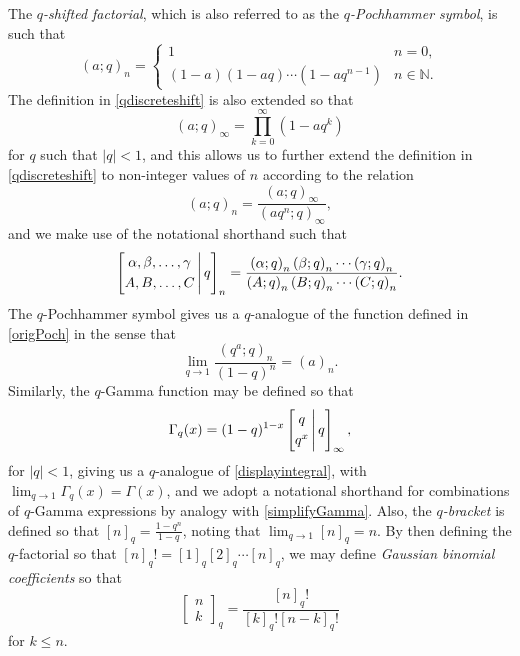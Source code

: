 \documentclass[12pt]{article}
\begin{document}
 The \emph{$q$-shifted factorial}, which is also referred to as the \emph{$q$-Pochhammer 
 symbol}, is such that 
\begin{equation}\label{qdiscreteshift}
 (a;q)_{n} = \begin{cases} 
 1 & n = 0, \\
 (1-a)(1-aq) \cdots (1-aq^{n-1}) & n \in \mathbb{N}. 
 \end{cases}
\end{equation}
 The definition in \eqref{qdiscreteshift} is also extended so that $$ (a;q)_{\infty} = \prod_{k=0}^{\infty} (1-aq^k) $$ for $q$ such that $|q| < 
 1$, and this allows us to further extend the definition in \eqref{qdiscreteshift} to 
 non-integer values of $n$ according to the relation 
 $$ (a;q)_{n} = \frac{(a;q)_{\infty}}{(aq^n;q)_{\infty}}, $$
 and we make use of the notational shorthand such that 
\begin{equation*}
 \left[ \begin{matrix} \alpha, \beta, \ldots, \gamma \vspace{1mm} \\ 
 A, B, \ldots, C \end{matrix} \, \Bigg| \, q \right]_{n} 
 = \frac{ \left( \alpha; q \right)_{n} 
 \left( \beta; q \right)_{n} \cdots \left( \gamma; q \right)_{n} }{ 
 \left( A; q \right)_{n} 
 \left( B; q \right)_{n} \cdots \left( C; q \right)_{n}}. 
\end{equation*}
 The $q$-Pochhammer symbol gives us a $q$-analogue of the function defined in \eqref{origPoch}
 in the sense that 
 $$ \lim_{q \to 1} \frac{ \left( q^{a};q \right)_{n} }{(1-q)^{n}} = (a)_{n}. $$
 Similarly, the $q$-Gamma function may be defined so that
 $$ \Gamma_{q}(x) = (1-q)^{1-x} \left[ \begin{matrix} q \vspace{1mm} \\ 
 q^{x} \end{matrix} \, \Bigg| \, q \right]_{\infty}, $$
 for $|q| < 1$, giving us a $q$-analogue of \eqref{displayintegral}, with 
 $ \lim_{q \to 1} \Gamma_{q}(x) = \Gamma(x)$, 
 and we adopt a notational shorthand for combinations of $q$-Gamma expressions
 by analogy with \eqref{simplifyGamma}. 
 Also, the \emph{$q$-bracket} 
 is defined so that $[n]_{q} = \frac{1-q^n}{1-q}$, 
 noting that $\lim_{q \to 1} [n]_{q} = n$. 
 By then defining the $q$-factorial
 so that $[n]_{q}! = [1]_{q} [2]_{q} \cdots [n]_{q}$, we may define \emph{Gaussian binomial coefficients}
 so that 
 $$ \left[ \begin{matrix} 
 n \\ 
 k 
 \end{matrix} \right]_{q} = \frac{ [n]_{q}! }{ [k]_{q}! [n-k]_{q}! } $$ for $ k \leq n$. 
\end{document}
